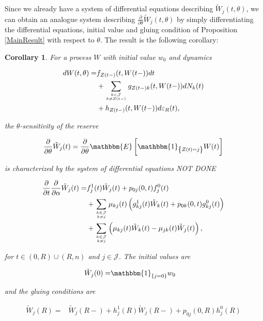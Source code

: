 \documentclass{book}
\newcommand{\1}[1]{\mathbbm{1}_{\left\lbrace #1 \right\rbrace}}
\newcommand{\expec}[1][def]{\mathbbm{E} \left[ #1 \right]}
\theoremstyle{break}
\newtheorem{corollary}[definition]{Corollary}
\theoremstyle{remark}
\numberwithin{equation}{section}
\begin{document}
Since we already have a system of differential equations describing $\tilde{W}_j(t,\theta)$, we can obtain an analogue system describing $\frac{\partial}{\partial \theta} \tilde{W}_j(t,\theta)$ by simply differentiating the differential equations, initial value and gluing condition of Proposition \ref{MainResult} with respect to $\theta$. The result is the following corollary:

\begin{corollary} \label{Corollary}
	For a process $W$ with initial value $w_0$ and dynamics
	
	\begin{align*}
		dW(t,\theta) =& f_{Z(t-)}(t,W(t-)) dt \\
		&+ \sum_{k \in \mathcal{J} \atop k \neq Z(t-)} g_{Z(t-)k}(t,W(t-)) dN_{k}(t) \\
		&+ h_{Z(t-)}(t,W(t-)) d \varepsilon_R(t),
	\end{align*}

	the $\theta$-sensitivity of the reserve
	
	\begin{align*}
		\frac{\partial}{\partial \theta} \tilde{W}_j(t) = \frac{\partial}{\partial \theta} \expec[\1{Z(t)=j} W(t)]
	\end{align*}
	
	is characterized by the system of differential equations NOT DONE
	
	\begin{align*}
		\frac{\partial}{\partial t} \frac{\partial}{\partial \alpha} \tilde{W}_j(t) =& f_j^1(t) \tilde{W}_j(t) + p_{0j}(0,t) f_j^0(t) \\
		&+ \sum_{k \in \mathcal{J} \atop k \neq j} \mu_{kj}(t) \left( g_{kj}^1(t) \tilde{W}_k(t) + p_{0k}(0,t) g_{kj}^0(t) \right) \\
		&+ \sum_{k \in \mathcal{J} \atop k \neq j} \left( \mu_{kj}(t) \tilde{W}_k(t) - \mu_{jk}(t) \tilde{W}_j(t) \right),
	\end{align*}
	
	for $t \in (0,R)\cup(R,n)$ and $j \in \mathcal{J}$. The initial values are
	
	\begin{align*}
		\tilde{W}_j(0) =& \1{j=0} w_0
	\end{align*}
	
	and the gluing conditions are
	
	\begin{align*}
		\tilde{W}_j(R) =& \tilde{W}_j(R-) + h_j^1(R) \tilde{W}_j(R-) + p_{0j}(0,R) h_j^0(R)
	\end{align*}
\end{corollary}
\end{document}
